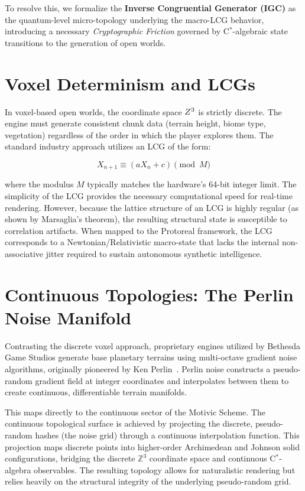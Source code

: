 To resolve this, we formalize the \textbf{Inverse Congruential Generator (IGC)} as the quantum-level micro-topology underlying the macro-LCG behavior, introducing a necessary \textit{Cryptographic Friction} governed by C$^*$-algebraic state transitions to the generation of open worlds.

\section{Voxel Determinism and LCGs}

In voxel-based open worlds, the coordinate space $Z^3$ is strictly discrete. The engine must generate consistent chunk data (terrain height, biome type, vegetation) regardless of the order in which the player explores them. The standard industry approach utilizes an LCG of the form:

\[
X_{n+1} \equiv (a X_n + c) \pmod{M}
\]

where the modulus $M$ typically matches the hardware's 64-bit integer limit. The simplicity of the LCG provides the necessary computational speed for real-time rendering. However, because the lattice structure of an LCG is highly regular (as shown by Marsaglia's theorem), the resulting structural state is susceptible to correlation artifacts. When mapped to the Protoreal framework, the LCG corresponds to a Newtonian/Relativistic macro-state that lacks the internal non-associative jitter required to sustain autonomous synthetic intelligence.

\section{Continuous Topologies: The Perlin Noise Manifold}

Contrasting the discrete voxel approach, proprietary engines utilized by Bethesda Game Studios generate base planetary terrains using multi-octave gradient noise algorithms, originally pioneered by Ken Perlin~\cite{perlin1985image}. Perlin noise constructs a pseudo-random gradient field at integer coordinates and interpolates between them to create continuous, differentiable terrain manifolds.

This maps directly to the continuous sector of the Motivic Scheme. The continuous topological surface is achieved by projecting the discrete, pseudo-random hashes (the noise grid) through a continuous interpolation function. This projection maps discrete points into higher-order Archimedean and Johnson solid configurations, bridging the discrete $\mathbb{Z}^3$ coordinate space and continuous C$^*$-algebra observables. The resulting topology allows for naturalistic rendering but relies heavily on the structural integrity of the underlying pseudo-random grid.

